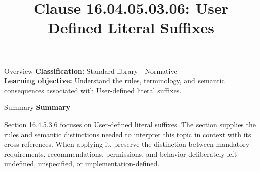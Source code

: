 \documentclass[10pt,letterpaper]{article}
\title{Clause 16.04.05.03.06: User Defined Literal Suffixes}
\author{}
\date{}
\begin{document}
\maketitle
\begin{CornellOverviewBox}{Overview}
\textbf{Classification:} Standard library - Normative\\[2pt]
\textbf{Learning objective:} Understand the rules, terminology, and semantic consequences associated with User-defined literal suffixes.
\end{CornellOverviewBox}\begin{CornellSummaryBox}{Summary}
{\sffamily\bfseries\color{Accent} Summary}\par\vspace{3pt}Section 16.4.5.3.6 focuses on User-defined literal suffixes. The section supplies the rules and semantic distinctions needed to interpret this topic in context with its cross-references. When applying it, preserve the distinction between mandatory requirements, recommendations, permissions, and behavior deliberately left undefined, unspecified, or implementation-defined.
\end{CornellSummaryBox}
\end{document}
